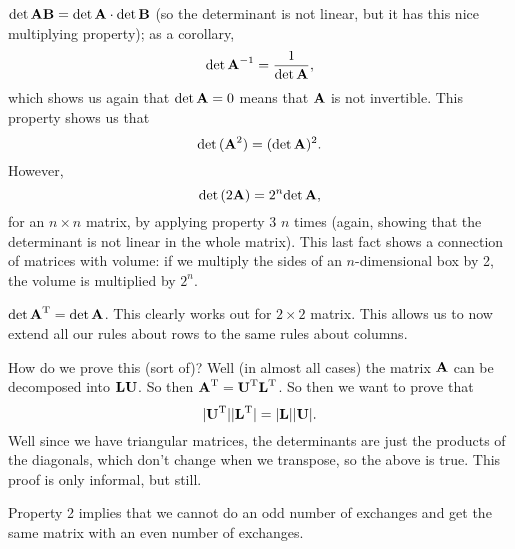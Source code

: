 \erm
\item $\mathrm{det}\, \boldsymbol{\mathbf{A}}\boldsymbol{\mathbf{B}} = \mathrm{det}\, \boldsymbol{\mathbf{A}} \cdot \mathrm{det}\, \boldsymbol{\mathbf{B}}$ (so the determinant is not linear, but it has this nice multiplying property); as a corollary, 
\[ \mathrm{det}\, \boldsymbol{\mathbf{A}}^{-1} = \frac 1{\mathrm{det}\, \boldsymbol{\mathbf{A}}}, \]
which shows us again that $\mathrm{det}\, \boldsymbol{\mathbf{A}} = 0$ means that $\boldsymbol{\mathbf{A}}$ is not invertible. 
This property shows us that
\[ \mathrm{det}\, (\boldsymbol{\mathbf{A}}^2) = (\mathrm{det}\, \boldsymbol{\mathbf{A}})^2. \]
However, 
\[ \mathrm{det}\, (2\boldsymbol{\mathbf{A}}) = 2^n \mathrm{det}\, \boldsymbol{\mathbf{A}}, \]
for an $n \times n$ matrix, by applying property 3 $n$ times (again, showing that the determinant is not linear in the whole matrix). This last fact shows a connection of matrices with volume: if we multiply the sides of an $n$-dimensional box by 2, the volume is multiplied by $2^n$. 
\item $\mathrm{det}\, \boldsymbol{\mathbf{A}}^\mathrm{T} = \mathrm{det}\, \boldsymbol{\mathbf{A}}$. This clearly works out for $2 \times 2$ matrix. This allows us to now extend all our rules about rows to the same rules about columns.

How do we prove this (sort of)? Well (in almost all cases) the matrix $\boldsymbol{\mathbf{A}}$ can be decomposed into $\boldsymbol{\mathbf{L}}\boldsymbol{\mathbf{U}}$. So then $\boldsymbol{\mathbf{A}}^\mathrm{T} = \boldsymbol{\mathbf{U}}^\mathrm{T}\boldsymbol{\mathbf{L}}^\mathrm{T}$. So then we want to prove that
\[ |\boldsymbol{\mathbf{U}}^\mathrm{T}||\boldsymbol{\mathbf{L}}^\mathrm{T}| = |\boldsymbol{\mathbf{L}}||\boldsymbol{\mathbf{U}}|. \]
Well since we have triangular matrices, the determinants are just the products of the diagonals, which don't change when we transpose, so the above is true. This proof is only informal, but still. 
\eit

\brm
Property 2 implies that we cannot do an odd number of exchanges and get the same matrix with an even number of exchanges.
\erm
